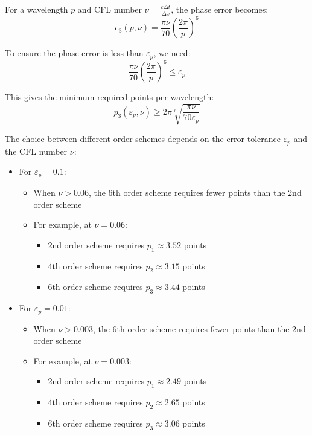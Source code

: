 \documentclass[a4paper, 12pt]{article}
\begin{document}
For a wavelength $p$ and CFL number $\nu = \frac{c\Delta t}{\Delta x}$, the phase error becomes:
\begin{equation}
    e_3(p, \nu) = \frac{\pi \nu}{70} \left(\frac{2\pi}{p}\right)^6
\end{equation}

To ensure the phase error is less than $\varepsilon_p$, we need:
\begin{equation}
    \frac{\pi \nu}{70} \left(\frac{2\pi}{p}\right)^6 \leq \varepsilon_p
\end{equation}

This gives the minimum required points per wavelength:
\begin{equation}
    p_3(\varepsilon_p, \nu) \geq 2\pi \sqrt[6]{\frac{\pi \nu}{70 \varepsilon_p}}
\end{equation}

The choice between different order schemes depends on the error tolerance $\varepsilon_p$ and the CFL number $\nu$:

\begin{itemize}
    \item For $\varepsilon_p = 0.1$:
    \begin{itemize}
        \item When $\nu > 0.06$, the 6th order scheme requires fewer points than the 2nd order scheme
        \item For example, at $\nu = 0.06$:
        \begin{itemize}
            \item 2nd order scheme requires $p_1 \approx 3.52$ points
            \item 4th order scheme requires $p_2 \approx 3.15$ points
            \item 6th order scheme requires $p_3 \approx 3.44$ points
        \end{itemize}
    \end{itemize}
    
    \item For $\varepsilon_p = 0.01$:
    \begin{itemize}
        \item When $\nu > 0.003$, the 6th order scheme requires fewer points than the 2nd order scheme
        \item For example, at $\nu = 0.003$:
        \begin{itemize}
            \item 2nd order scheme requires $p_1 \approx 2.49$ points
            \item 4th order scheme requires $p_2 \approx 2.65$ points
            \item 6th order scheme requires $p_3 \approx 3.06$ points
        \end{itemize}
    \end{itemize}
\end{itemize}
\end{document}
